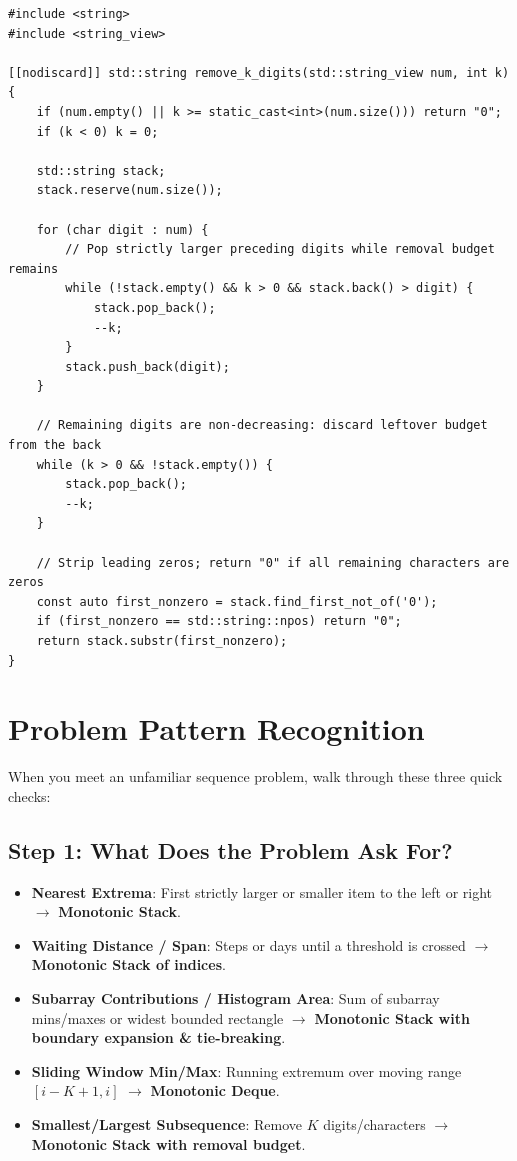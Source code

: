 \documentclass[11pt,a4paper]{article}
\theoremstyle{definition}
\begin{document}
\begin{lstlisting}[caption=Remove K Digits with Monotonic Stack in C++23]
#include <string>
#include <string_view>

[[nodiscard]] std::string remove_k_digits(std::string_view num, int k) {
    if (num.empty() || k >= static_cast<int>(num.size())) return "0";
    if (k < 0) k = 0;

    std::string stack;
    stack.reserve(num.size());

    for (char digit : num) {
        // Pop strictly larger preceding digits while removal budget remains
        while (!stack.empty() && k > 0 && stack.back() > digit) {
            stack.pop_back();
            --k;
        }
        stack.push_back(digit);
    }

    // Remaining digits are non-decreasing: discard leftover budget from the back
    while (k > 0 && !stack.empty()) {
        stack.pop_back();
        --k;
    }

    // Strip leading zeros; return "0" if all remaining characters are zeros
    const auto first_nonzero = stack.find_first_not_of('0');
    if (first_nonzero == std::string::npos) return "0";
    return stack.substr(first_nonzero);
}
\end{lstlisting}

\section{Problem Pattern Recognition}

When you meet an unfamiliar sequence problem, walk through these three quick checks:

\subsection*{Step 1: What Does the Problem Ask For?}
\begin{itemize}
    \item \textbf{Nearest Extrema}: First strictly larger or smaller item to the left or right $\to$ \textbf{Monotonic Stack}.
    \item \textbf{Waiting Distance / Span}: Steps or days until a threshold is crossed $\to$ \textbf{Monotonic Stack of indices}.
    \item \textbf{Subarray Contributions / Histogram Area}: Sum of subarray mins/maxes or widest bounded rectangle $\to$ \textbf{Monotonic Stack with boundary expansion \& tie-breaking}.
    \item \textbf{Sliding Window Min/Max}: Running extremum over moving range $[i - K + 1, i]$ $\to$ \textbf{Monotonic Deque}.
    \item \textbf{Smallest/Largest Subsequence}: Remove $K$ digits/characters $\to$ \textbf{Monotonic Stack with removal budget}.
\end{itemize}
\end{document}
